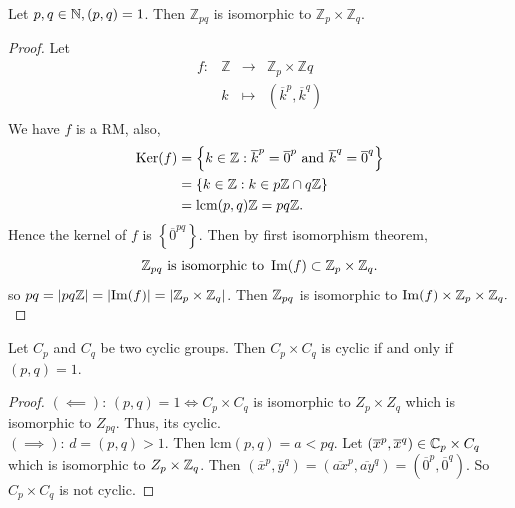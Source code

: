 \begin{theorem}
  Let $p,q \in  \mathbb{N}, (p, q) = 1$. Then $\mathbb{Z}_{pq}$ is isomorphic to $\mathbb{Z}_{p} \times \mathbb{Z}_{q} $.
\end{theorem}
\begin{proof}
Let \[
\begin{array}{cccc}
      f : &  \mathbb{Z}  & \longrightarrow & \mathbb{Z}_{p} \times 
      \mathbb{Z}q\\

           &  k  & \longmapsto     & (\overline{k}^{p}, \overline{k}^{q})  \\ 
\end{array}
\]
We have $f$ is a RM, also,
\begin{align*}
\text{Ker}  (f) 
&= 
\left\{ k \in   \mathbb{Z}: \overline{k}^{p} = \overline{0}^{p}
\text{ and }  \overline{k}^{q}= \overline{0}^{q}\right\} \\
&= 
\left\{ k \in   \mathbb{Z}: 
k \in   p\mathbb{Z} \cap q \mathbb{Z}\right\} \\
&= \text{lcm} (p , q)\mathbb{Z} = pq \mathbb{Z}.
\end{align*}
Hence the kernel of $f$ is $\left\{ \overline{0}^{pq} \right\}$. Then 
by first isomorphism theorem, 
\[
\mathbb{Z}_{pq} \text{ is isomorphic to } \operatorname{Im} (f)  \subset 
\mathbb{Z}_{p} \times \mathbb{Z}_{q}.
\]
so $pq = \left| pq \mathbb{Z} \right|  = \left| \operatorname{Im} (f)  \right|  =
\left| \mathbb{Z}_{p} \times \mathbb{Z}_{q}  \right|  $. Then 
$\mathbb{Z}_{pq}$ is isomorphic to $\operatorname{Im} (f) \times \mathbb{Z}_{p} \times \mathbb{Z}_{q}.$   
\end{proof}
\begin{proposition}[]
Let $C_{p}$ and $C_{q}$ be two cyclic groups. Then 
$C_{p} \times C_{q} $ is cyclic if and only if 
$(p, q) = 1.$ 
\end{proposition}
\begin{proof}
   $( \impliedby  ) $: $(p, q)=1 \iff C_{p} \times C_{q} $ is 
  isomorphic to $Z_{p} \times Z_{q}$ which is isomorphic to 
  $Z_{pq}$. Thus, its cyclic. \\$( \implies ) $: 
  $d = (p, q)  > 1$. Then $\text{lcm}  (p, q) = a < pq$. Let
  $(\overline{x}^{p}, \overline{x}^{q}) \in  \mathbb{C} _{p} \times C_{q} $ 
  which is isomorphic to $Z_{p}\times \mathbb{Z}_{q}$. Then 
  $(\overline{x}^{p}, \overline{y}^{q}) = (\overline{ax}^{p}, 
  \overline{ay}^{q}) = (\overline{0}^{p}, \overline{0}^{q}). $ So
  $C_{p} \times C_{q} $ is not cyclic.
\end{proof}
\divider
